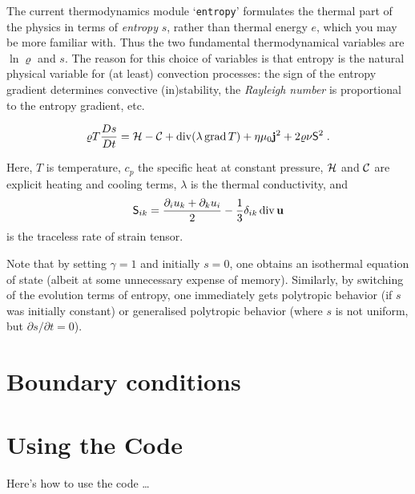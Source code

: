 \documentclass[12pt,twoside,notitlepage,a4paper]{article}
\newcommand{\file}[1]{`\texttt{#1}'}
\newcommand{\grad}    {\mathop{\rm grad}\nolimits}
\newcommand{\Div}     {\mathop{\rm div}\nolimits}
\newcommand{\vekt}[1] {\mathbf{#1}}
\newcommand{\Cool}          {{\cal C}}
\newcommand{\Heat}          {{\cal H}}
\newcommand{\jv}            {\vekt{j}}
\newcommand{\uv}            {\vekt{u}}
\begin{document}
The current thermodynamics module \file{entropy} formulates the thermal
part of the physics in terms of \emph{entropy} $s$, rather than thermal
energy $e$, which you may be more familiar with.
Thus the two fundamental thermodynamical variables are $\ln\varrho$
and $s$.
The reason for this choice of variables is that entropy is the natural
physical variable for (at least) convection processes: the sign of the
entropy gradient determines convective (in)stability, the
\emph{Rayleigh number} is proportional to the entropy gradient, etc.

\begin{equation}
  \varrho T\frac{Ds}{Dt}
   =  \Heat - \Cool
      + \Div(\lambda\grad T)
      + \eta\mu_0 \jv^2
      + 2\varrho\nu {\sf S}^2 \; .
\end{equation}

Here, $T$ is temperature, $c_p$ the specific heat at constant pressure,
$\Heat$ and $\Cool$ are explicit heating and cooling terms,
$\lambda$ is the thermal conductivity, and
\begin{equation}
  {\sf S}_{ik} = \frac{\partial_i u_k + \partial_k u_i}{2}
                 -\frac{1}{3} \delta_{ik}\Div\uv
\end{equation}
is the traceless rate of strain tensor.

\bigskip

Note that by setting $\gamma=1$ and initially $s=0$, one obtains an
isothermal equation of state (albeit at some unnecessary expense of
memory).
Similarly, by switching of the evolution terms of entropy, one immediately
gets polytropic behavior (if $s$ was initially constant) or generalised
polytropic behavior
(where $s$ is not uniform, but $\partial s/\partial t = 0$).



\section{Boundary conditions}



\section{Using the Code}
\label{Input-params}

Here's how to use the code \ldots

\end{document}
